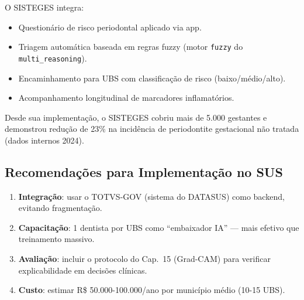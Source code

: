 
O SISTEGES integra:
\begin{itemize}
    \item Questionário de risco periodontal aplicado via app.
    \item Triagem automática baseada em regras fuzzy (motor
    \texttt{fuzzy} do \texttt{multi\_reasoning}).
    \item Encaminhamento para UBS com classificação de risco
    (baixo/médio/alto).
    \item Acompanhamento longitudinal de marcadores inflamatórios.
\end{itemize}

Desde sua implementação, o SISTEGES cobriu mais de 5.000 gestantes
e demonstrou redução de 23\% na incidência de periodontite
gestacional não tratada (dados internos 2024).

\subsection*{Recomendações para Implementação no SUS}

\begin{enumerate}
    \item \textbf{Integração}: usar o TOTVS-GOV (sistema do DATASUS)
    como backend, evitando fragmentação.
    \item \textbf{Capacitação}: 1 dentista por UBS como
    ``embaixador IA'' --- mais efetivo que treinamento massivo.
    \item \textbf{Avaliação}: incluir o protocolo do Cap.~15
    (Grad-CAM) para verificar explicabilidade em decisões clínicas.
    \item \textbf{Custo}: estimar R\$ 50.000-100.000/ano por município
    médio (10-15 UBS).
\end{enumerate}
